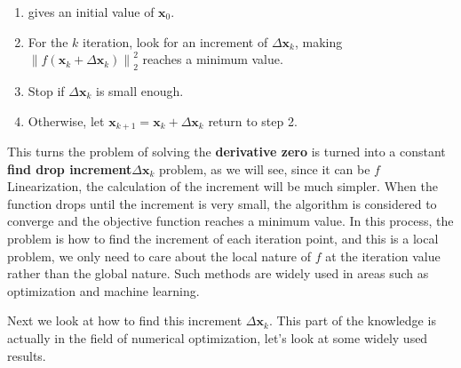 \begin{mdframed}
\begin{enumerate}
\item gives an initial value of $\bm{x}_0$.
\item For the $k$ iteration, look for an increment of $\Delta \bm{x}_k$, making $\left\| {f\left( \bm{x}_k + \Delta \bm{x} _k \right)} \right \|^2_2$ reaches a minimum value.
\item Stop if $\Delta \bm{x}_k$ is small enough.
\item Otherwise, let $\bm{x}_{k+1} = \bm{x}_k+\Delta \bm{x}_k$ return to step 2.
\end{enumerate}
\end{mdframed}
This turns the problem of solving the \textbf{derivative zero} is turned into a constant \textbf{find drop increment}$\Delta \bm{x}_k$ problem, as we will see, since it can be $f$ Linearization, the calculation of the increment will be much simpler. When the function drops until the increment is very small, the algorithm is considered to converge and the objective function reaches a minimum value. In this process, the problem is how to find the increment of each iteration point, and this is a local problem, we only need to care about the local nature of $f$ at the iteration value rather than the global nature. Such methods are widely used in areas such as optimization and machine learning.

Next we look at how to find this increment $\Delta \bm{x}_k$. This part of the knowledge is actually in the field of numerical optimization, let's look at some widely used results.


